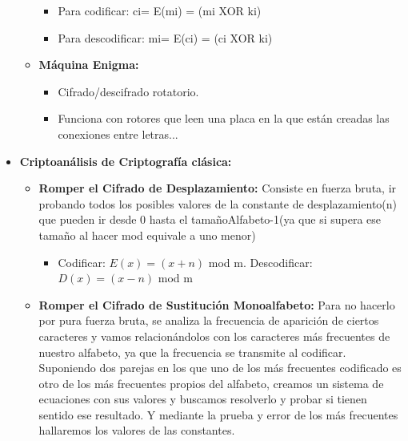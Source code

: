 \documentclass[12pt, twoside, openright]{report} %
\begin{document}
\begin{itemize}
\begin{itemize}
\begin{itemize}
      \item Para codificar: ci= E(mi) = (mi XOR ki)
        
      \item Para descodificar: mi= E(ci) = (ci XOR ki)
        
      \end{itemize}
    \item \textbf{Máquina Enigma:}
      

      \begin{itemize}
      \item Cifrado/descifrado rotatorio.
        
      \item Funciona con rotores que leen una placa en la que están creadas
        las conexiones entre letras...
        
      \end{itemize}
    \end{itemize}
  \item \textbf{Criptoanálisis de Criptografía clásica:}
    

    \begin{itemize}
    \item \textbf{Romper el Cifrado de Desplazamiento:} Consiste en fuerza
      bruta, ir probando todos los posibles valores de la constante de
      desplazamiento(n) que pueden ir desde 0 hasta el
      tamañoAlfabeto-1(ya que si supera ese tamaño al hacer mod equivale
      a uno menor)
      

      \begin{itemize}
      \item Codificar: $E(x)=(x+n)$ mod m. Descodificar: $D(x)=(x-n)$ mod m
        
      \end{itemize}
    \item \textbf{Romper el Cifrado de Sustitución Monoalfabeto:} Para no
      hacerlo por pura fuerza bruta, se analiza la frecuencia de
      aparición de ciertos caracteres y vamos relacionándolos con los
      caracteres más frecuentes de nuestro alfabeto, ya que la
      frecuencia se transmite al codificar. Suponiendo dos parejas en
      los que uno de los más frecuentes codificado es otro de los más
      frecuentes propios del alfabeto, creamos un sistema de ecuaciones
      con sus valores y buscamos resolverlo y probar si tienen sentido
      ese resultado. Y mediante la prueba y error de los más frecuentes
      hallaremos los valores de las constantes.
      


\end{itemize}
\end{itemize}
\end{document}
